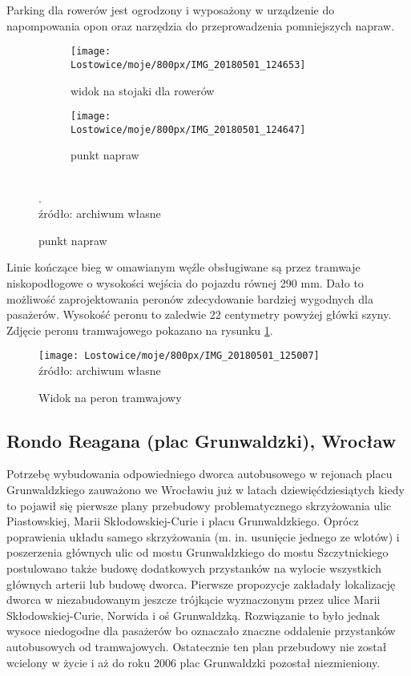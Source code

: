 \documentclass[twoside,12pt]{article}
\begin{document}
	Parking dla rowerów jest ogrodzony i wyposażony w urządzenie do napompowania opon oraz narzędzia do przeprowadzenia pomniejszych napraw.
	
	\begin{figure}[H]
		\centering
		\caption{Parking rowerowy}
		\begin{subfigure}{.66\textwidth}
	  \centering
	  \caption{widok na stojaki dla rowerów}
	  \texttt{[image: Lostowice/moje/800px/IMG\_20180501\_124653]}
		\end{subfigure}%
		\hfill%
		\begin{subfigure}{.33\textwidth}
	  \centering
	  \caption{punkt napraw}
	  \texttt{[image: Lostowice/moje/800px/IMG\_20180501\_124647]}
		\end{subfigure}\\
		
		\footnotesize{. \\ źródło: archiwum własne}
	\end{figure}	
	
	Linie kończące bieg w omawianym węźle obsługiwane są przez tramwaje niskopodłogowe o wysokości wejścia do pojazdu równej 290 mm. Dało to możliwość zaprojektowania peronów zdecydowanie bardziej wygodnych dla pasażerów. Wysokość peronu to zaledwie 22 centymetry powyżej główki szyny. Zdjęcie peronu tramwajowego pokazano na rysunku \ref{lostowice4}.
	
		\begin{figure}[H]
		\centering
		\caption{Widok na peron tramwajowy}
		\texttt{[image: Lostowice/moje/800px/IMG\_20180501\_125007]}\\
		\footnotesize{źródło: archiwum własne}
		\label{lostowice4}
	\end{figure}
	
	\subsection{Rondo Reagana (plac Grunwaldzki), Wrocław}
	
	Potrzebę wybudowania odpowiedniego dworca autobusowego w rejonach placu Grunwaldzkiego zauważono we Wrocławiu już w latach dziewięćdziesiątych kiedy to pojawił się pierwsze plany przebudowy problematycznego skrzyżowania ulic Piastowskiej, Marii Skłodowskiej-Curie i placu Grunwaldzkiego. Oprócz poprawienia układu samego skrzyżowania (m. in. usunięcie jednego ze wlotów) i poszerzenia głównych ulic od mostu Grunwaldzkiego do mostu Szczytnickiego postulowano także budowę dodatkowych przystanków na wylocie wszystkich głównych arterii lub budowę dworca. Pierwsze propozycje zakładały lokalizację dworca w niezabudowanym jeszcze trójkącie wyznaczonym przez ulice Marii Skłodowskiej-Curie, Norwida i oś Grunwaldzką. Rozwiązanie to było jednak wysoce niedogodne dla pasażerów bo oznaczało znaczne oddalenie przystanków autobusowych od tramwajowych. Ostatecznie ten plan przebudowy nie został wcielony w życie i aż do roku 2006 plac Grunwaldzki pozostał niezmieniony. 
	
\end{document}
